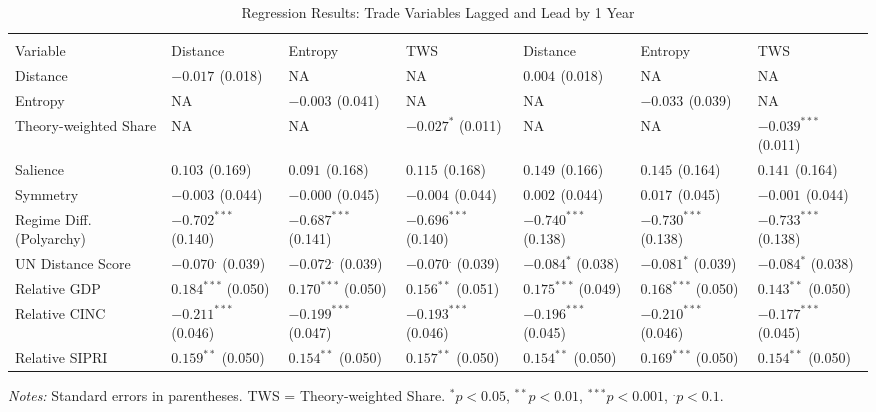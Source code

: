 \documentclass[12pt]{article}
\begin{document}
\begin{table}[htbp]
\scriptsize
\centering
\caption{Regression Results: Trade Variables Lagged and Lead by 1 Year}
\renewcommand{\arraystretch}{1.2}
\begin{tabularx}{\textwidth}{l
  >{\centering\arraybackslash}X
  >{\centering\arraybackslash}X
  >{\centering\arraybackslash}X
  >{\centering\arraybackslash}X
  >{\centering\arraybackslash}X
  >{\centering\arraybackslash}X}
\toprule
\rowcolor{gray!20}
& \multicolumn{3}{c}{Lagged (t$-$1)} & \multicolumn{3}{c}{Lead (t$+$1)} \\
\cmidrule(lr){2-4} \cmidrule(lr){5-7}
Variable & Distance & Entropy & TWS & Distance & Entropy & TWS \\
\midrule
Distance                & $-0.017^{}$ (0.018) & NA                  & NA                  & $0.004^{}$ (0.018)  & NA                  & NA                  \\
Entropy                 & NA                  & $-0.003^{}$ (0.041) & NA                  & NA                  & $-0.033^{}$ (0.039) & NA                  \\
Theory-weighted Share   & NA                  & NA                  & $-0.027^{*}$ (0.011) & NA                  & NA                  & $-0.039^{***}$ (0.011) \\
Salience                & $0.103^{}$ (0.169)  & $0.091^{}$ (0.168)  & $0.115^{}$ (0.168)  & $0.149^{}$ (0.166)  & $0.145^{}$ (0.164)  & $0.141^{}$ (0.164)  \\
Symmetry                & $-0.003^{}$ (0.044) & $-0.000^{}$ (0.045) & $-0.004^{}$ (0.044) & $0.002^{}$ (0.044)  & $0.017^{}$ (0.045)  & $-0.001^{}$ (0.044) \\
Regime Diff. (Polyarchy)& $-0.702^{***}$ (0.140) & $-0.687^{***}$ (0.141) & $-0.696^{***}$ (0.140) & $-0.740^{***}$ (0.138) & $-0.730^{***}$ (0.138) & $-0.733^{***}$ (0.138) \\
UN Distance Score       & $-0.070^{.}$ (0.039) & $-0.072^{.}$ (0.039) & $-0.070^{.}$ (0.039) & $-0.084^{*}$ (0.038) & $-0.081^{*}$ (0.039) & $-0.084^{*}$ (0.038) \\
Relative GDP            & $0.184^{***}$ (0.050) & $0.170^{***}$ (0.050) & $0.156^{**}$ (0.051) & $0.175^{***}$ (0.049) & $0.168^{***}$ (0.050) & $0.143^{**}$ (0.050) \\
Relative CINC           & $-0.211^{***}$ (0.046) & $-0.199^{***}$ (0.047) & $-0.193^{***}$ (0.046) & $-0.196^{***}$ (0.045) & $-0.210^{***}$ (0.046) & $-0.177^{***}$ (0.045) \\
Relative SIPRI          & $0.159^{**}$ (0.050) & $0.154^{**}$ (0.050) & $0.157^{**}$ (0.050) & $0.154^{**}$ (0.050) & $0.169^{***}$ (0.050) & $0.154^{**}$ (0.050) \\
\bottomrule
\end{tabularx}
\begin{tablenotes}
\footnotesize
\item[] \textit{Notes:} Standard errors in parentheses. TWS = Theory-weighted Share. $^{*} p<0.05$, $^{**} p<0.01$, $^{***} p<0.001$, $^{.} p<0.1$.
\end{tablenotes}
\end{table}
\end{document}
